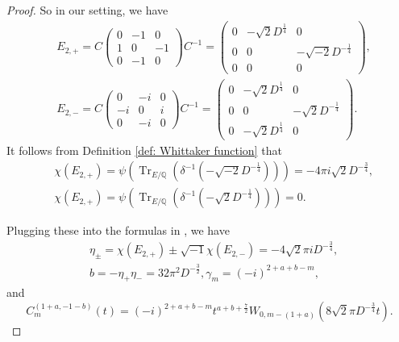 \documentclass[11pt, a4paper]{amsart}
\theoremstyle{plain}
\theoremstyle{definition}
\numberwithin{equation}{section}
\def\QQ{\mathbb{Q}}
\DeclareMathOperator{\Tr}{Tr}
\begin{document}
\begin{proof}
    So in our setting, we have 
    \begin{align*}
        & E_{2, +} = C \begin{pmatrix}
                          0 & -1 & 0 \\
                          1 & 0 & -1 \\
                          0 & -1 & 0
                     \end{pmatrix} C^{-1} = \begin{pmatrix}
                                                0 & -\sqrt{2}D^{\frac{1}{4}} & 0 \\
                                                0 & 0 & -\sqrt{-2}D^{-\frac{1}{4}} \\
                                                0 & 0 & 0
                                             \end{pmatrix}, \\
         & E_{2, -} = C \begin{pmatrix}
                          0 & -i & 0 \\
                          -i & 0 & i \\
                          0 & -i & 0
                     \end{pmatrix} C^{-1} = \begin{pmatrix}
                                                0 & -\sqrt{2}D^{\frac{1}{4}} & 0 \\
                                                0 & 0 & -\sqrt{2}D^{-\frac{1}{4}} \\
                                                0 & -\sqrt{2}D^{\frac{1}{4}} & 0
                                             \end{pmatrix}.                                    
    \end{align*}
    It follows from Definition \ref{def: Whittaker function} that 
    \begin{align*}
        & \chi(E_{2, +}) = \psi(\Tr_{E/\QQ}(\delta^{-1}(-\sqrt{-2}D^{-\frac{1}{4}}))) = -4\pi{i}\sqrt{2}D^{-\frac{3}{4}}, \\
        & \chi(E_{2, +}) = \psi(\Tr_{E/\QQ}(\delta^{-1}(-\sqrt{2}D^{-\frac{1}{4}}))) = 0. 
    \end{align*}
    \par Plugging these into the formulas in \cite[Theorem (4.5), Page 977]{Koseki-Oda95}, we have 
    \begin{align*}
        & \eta_{\pm} = \chi(E_{2, +}) \pm \sqrt{-1} \chi(E_{2, -}) = -4\sqrt{2} \pi{i} D^{-\frac{3}{4}}, \\
        & b = -\eta_{+}\eta_{-} = 32\pi^{2} D^{-\frac{3}{2}}, \gamma_m = (-i)^{2 + a + b - m},
    \end{align*}
    and 
    \begin{equation*}
           C_m^{(1+a, -1-b)}(t) = (-i)^{2 + a + b -m}t^{a + b + \frac{7}{2}} W_{0, m-(1+a)}(8\sqrt{2} \pi D^{-\frac{3}{4}}t). 
    \end{equation*}
\end{proof}
\end{document}
